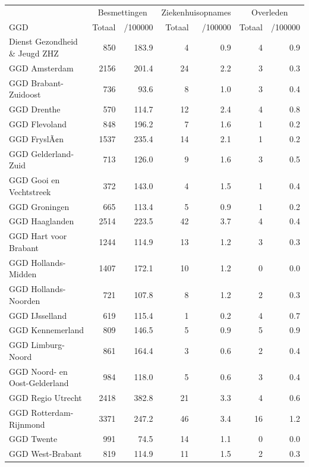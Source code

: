 \documentclass[
  english,
  man,floatsintext]{apa6}
\begin{document}
\begin{table}
\centering\begingroup\fontsize{10}{12}\selectfont

\begin{threeparttable}
\begin{tabular}{lrrrrrr}
\toprule
\multicolumn{1}{c}{ } & \multicolumn{2}{c}{Besmettingen} & \multicolumn{2}{c}{Ziekenhuisopnames} & \multicolumn{2}{c}{Overleden} \\
\cmidrule(l{3pt}r{3pt}){2-3} \cmidrule(l{3pt}r{3pt}){4-5} \cmidrule(l{3pt}r{3pt}){6-7}
GGD & Totaal & /100000 & Totaal & /100000 & Totaal & /100000\\
\midrule
Dienst Gezondheid \& Jeugd ZHZ & 850 & 183.9 & 4 & 0.9 & 4 & 0.9\\
GGD Amsterdam & 2156 & 201.4 & 24 & 2.2 & 3 & 0.3\\
GGD Brabant-Zuidoost & 736 & 93.6 & 8 & 1.0 & 3 & 0.4\\
GGD Drenthe & 570 & 114.7 & 12 & 2.4 & 4 & 0.8\\
GGD Flevoland & 848 & 196.2 & 7 & 1.6 & 1 & 0.2\\
GGD FryslÃ¢n & 1537 & 235.4 & 14 & 2.1 & 1 & 0.2\\
GGD Gelderland-Zuid & 713 & 126.0 & 9 & 1.6 & 3 & 0.5\\
GGD Gooi en Vechtstreek & 372 & 143.0 & 4 & 1.5 & 1 & 0.4\\
GGD Groningen & 665 & 113.4 & 5 & 0.9 & 1 & 0.2\\
GGD Haaglanden & 2514 & 223.5 & 42 & 3.7 & 4 & 0.4\\
GGD Hart voor Brabant & 1244 & 114.9 & 13 & 1.2 & 3 & 0.3\\
GGD Hollands-Midden & 1407 & 172.1 & 10 & 1.2 & 0 & 0.0\\
GGD Hollands-Noorden & 721 & 107.8 & 8 & 1.2 & 2 & 0.3\\
GGD IJsselland & 619 & 115.4 & 1 & 0.2 & 4 & 0.7\\
GGD Kennemerland & 809 & 146.5 & 5 & 0.9 & 5 & 0.9\\
GGD Limburg-Noord & 861 & 164.4 & 3 & 0.6 & 2 & 0.4\\
GGD Noord- en Oost-Gelderland & 984 & 118.0 & 5 & 0.6 & 3 & 0.4\\
GGD Regio Utrecht & 2418 & 382.8 & 21 & 3.3 & 4 & 0.6\\
GGD Rotterdam-Rijnmond & 3371 & 247.2 & 46 & 3.4 & 16 & 1.2\\
GGD Twente & 991 & 74.5 & 14 & 1.1 & 0 & 0.0\\
GGD West-Brabant & 819 & 114.9 & 11 & 1.5 & 2 & 0.3\\

\end{tabular}
\end{threeparttable}
\end{table}
\end{document}
